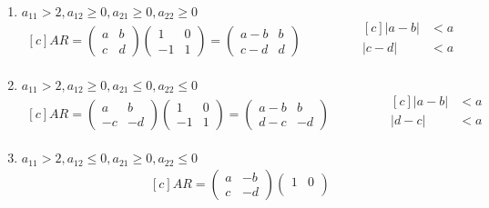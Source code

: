 \documentclass{article}
\newcommand\tab[1][0.6cm]{\hspace*{#1}}
\newcommand\nl{\newline\tab}
\begin{document}
\begin{enumerate}
\begin{enumerate}
			 \item $a_{11} > 2, a_{12} \geq 0, a_{21} \geq 0, a_{22} \geq 0$ \nl
			 $$
			 \begin{aligned}[c]
			 AR = 
			 \begin{pmatrix}
			 a & b \\
			 c & d 
			 \end{pmatrix} 
			 \begin{pmatrix}
			 1 & 0 \\
			 -1 & 1 
			 \end{pmatrix} = 
			 \begin{pmatrix}
			 a-b & b \\
			 c-d & d 
			 \end{pmatrix}
			 \end{aligned}
			 \qquad\qquad
			 \begin{aligned}[c]
			 |a - b| &< a\\
			 |c - d| &< a\\
			 \end{aligned}
			 $$
			 \item $a_{11} > 2, a_{12} \geq 0, a_{21} \leq 0, a_{22} \leq 0$ \nl
			 $$
			 \begin{aligned}[c]
			 AR = 
			 \begin{pmatrix}
			 a & b \\
			 -c & -d 
			 \end{pmatrix} 
			 \begin{pmatrix}
			 1 & 0 \\
			 -1 & 1 
			 \end{pmatrix} = 
			 \begin{pmatrix}
			 a-b & b \\
			 d-c & -d 
			 \end{pmatrix}
			 \end{aligned}
			 \qquad\qquad
			 \begin{aligned}[c]
			 |a - b| &< a\\
			 |d - c| &< a\\
			 \end{aligned}
			 $$
			 \item $a_{11} > 2, a_{12} \leq 0, a_{21} \geq 0, a_{22} \leq 0$ \nl
			 $$
			 \begin{aligned}[c]
			 AR = 
			 \begin{pmatrix}
			 a & -b \\
			 c & -d 
			 \end{pmatrix} 
			 \begin{pmatrix}
			 1 & 0 \\

\end{pmatrix}
\end{aligned}$$
\end{enumerate}
\end{enumerate}
\end{document}
